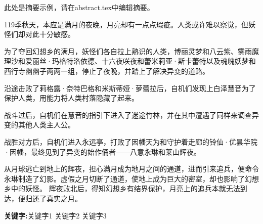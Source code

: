 \begin{cnabstract}

    此处是摘要示例，请在abstract.tex中编辑摘要。

    119季秋天，本应是满月的夜晚，月亮却有一点点瑕疵。人类或许难以察觉，但妖怪们却对此十分敏感。

    为了夺回幻想乡的满月，妖怪们各自拉上熟识的人类，博丽灵梦和八云紫、雾雨魔理沙和爱丽丝·玛格特洛依德、十六夜咲夜和蕾米莉亚·斯卡蕾特以及魂魄妖梦和西行寺幽幽子两两一组，停止了夜晚，并踏上了解决异变的道路。

    沿途击败了莉格露·奈特巴格和米斯蒂娅·萝蕾拉后，自机们发现上白泽慧音为了保护人类，用能力将人类村落隐藏了起来。

    战斗过后，自机们在慧音的指引下进入了迷途竹林，并在其中遭遇了同样来调查异变的其他人类主人公。

    战胜对方后，自机们进入永远亭，打败了因幡天为和守护着走廊的铃仙·优昙华院·因幡，最终见到了异变的始作俑者——八意永琳和莱山辉夜。

    从月球逃亡到地上的辉夜，担心满月成为地月之间的通道，进而引来追兵，便命令永琳制造了幻影。虚假之月切断了通道，使地上成为巨大的密室，却也影响了幻想乡中的妖怪。
    辉夜败北后，得知幻想乡有结界保护，月亮上的追兵本就无法到达，便归还了真实之月。
    \par\textbf{关键字:}关键字1 \hspace{2em} 关键字2 \hspace{2em} 关键字3
\end{cnabstract}
